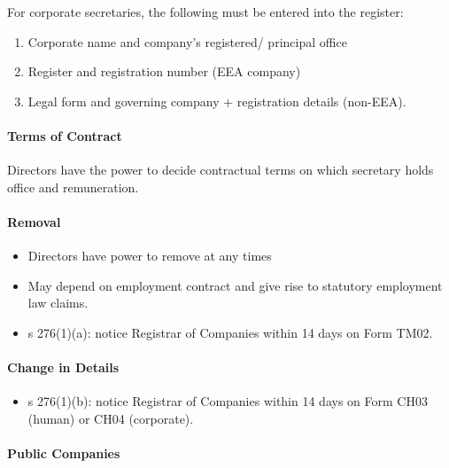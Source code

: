 \documentclass[
]{article}
\providecommand{\tightlist}{%
  \setlength{\itemsep}{0pt}\setlength{\parskip}{0pt}}
\begin{document}
For corporate secretaries, the following must be entered into the
register:

\begin{enumerate}
\def\labelenumi{\arabic{enumi}.}
\tightlist
\item
  Corporate name and company's registered/ principal office
\item
  Register and registration number (EEA company)
\item
  Legal form and governing company + registration details (non-EEA).
\end{enumerate}

\hypertarget{terms-of-contract}{%
\paragraph{Terms of Contract}\label{terms-of-contract}}

Directors have the power to decide contractual terms on which secretary
holds office and remuneration.

\hypertarget{removal}{%
\paragraph{Removal}\label{removal}}

\begin{itemize}
\tightlist
\item
  Directors have power to remove at any times
\item
  May depend on employment contract and give rise to statutory
  employment law claims.
\item
  s 276(1)(a): notice Registrar of Companies within 14 days on Form
  TM02.
\end{itemize}

\hypertarget{change-in-details}{%
\paragraph{Change in Details}\label{change-in-details}}

\begin{itemize}
\tightlist
\item
  s 276(1)(b): notice Registrar of Companies within 14 days on Form CH03
  (human) or CH04 (corporate).
\end{itemize}

\hypertarget{public-companies}{%
\paragraph{Public Companies}\label{public-companies}}
\end{document}
